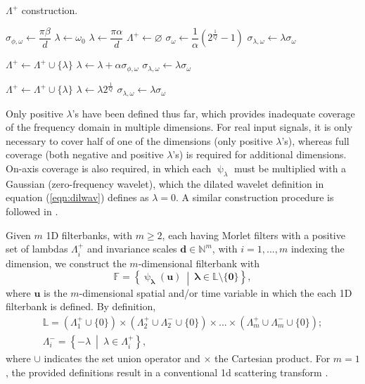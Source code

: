 \documentclass[journal]{IEEEtran}
\newcommand{\vect}[1]{\boldsymbol{\mathbf{#1}}}
\begin{document}
\begin{algorithm}    
\caption{$\Lambda^+$ construction.}\label{alg:fb}
\begin{algorithmic}
    \State $\sigma_{\phi, \omega} \gets \dfrac{\pi\beta}{d}$
        \State $\lambda \gets \omega_0$
    \Else{}
        \State $\lambda \gets \dfrac{\pi\alpha}{d}$
    \EndIf
    \State $\Lambda^+ \gets \varnothing$
    \State $\sigma_\omega \gets \dfrac{1}{\alpha}\left( 2^\frac{1}{Q} - 1 \right)$
    \State $\sigma_{\lambda, \omega} \gets \lambda\sigma_\omega$
    
        \State $\Lambda^+ \gets \Lambda^+ \cup \{\lambda\}$
        \State $\lambda \gets \lambda + \alpha \sigma_{\phi, \omega}$ 
        \State $\sigma_{\lambda, \omega} \gets \lambda\sigma_\omega$
    \EndWhile
    
    \While{$\lambda < \pi$}
        \State $\Lambda^+ \gets \Lambda^+ \cup \{\lambda\}$
        \State $\lambda \gets \lambda 2^{\frac{1}{Q}}$
        \State $\sigma_{\lambda, \omega} \gets \lambda\sigma_\omega$
    \EndWhile
\end{algorithmic}
\end{algorithm}

Only positive $\lambda$'s have been defined thus far, which provides inadequate coverage of the frequency domain in multiple dimensions. For real input signals, it is only necessary to cover half of one of the dimensions (only positive $\lambda$'s), whereas full coverage (both negative and positive $\lambda$'s) is required for additional dimensions. On-axis coverage is also required, in which each $\uppsi_\lambda$ must be multiplied with a Gaussian (zero-frequency wavelet), which the dilated wavelet definition in equation (\ref{eqn:dilwav}) defines as $\lambda=0$. A similar construction procedure is followed in \cite{jointtfscattering2}.

Given $m$ 1D filterbanks, with $m \ge 2$, each having Morlet filters with a positive set of lambdas $\Lambda_i^+$ and invariance scales $\vect{d} \in \mathbb{N}^m$, with $i = 1, ..., m$ indexing the dimension, we construct the $m$-dimensional filterbank with 
\begin{equation}
    \mathbb{F} = \left\{ \uppsi_{\vect{\lambda} }(\mathbf{u}) \ \middle| \ \vect{\lambda} \in \mathbb{L} \setminus \{\vect{0}\} \right\},
\end{equation}
where $\vect{u}$ is the $m$-dimensional spatial and/or time variable in which the each 1D filterbank is defined.  By definition, 
\begin{gather}
    \mathbb{L} = (\Lambda_1^+ \!\cup\! \{0\})\!\times\! (\Lambda_2^+ \!\cup\! \Lambda_2^- \!\cup \!\{0\}) \!\times\! ... \!\times\! (\Lambda_m^+ \!\cup\! \Lambda_m^- \!\cup\! \{0\}); \\
    \Lambda_i^- = \left\{-\lambda \ \middle| \ \lambda \in \Lambda_i^+\right\},
\end{gather}
where $\cup$ indicates the set union operator and $\times$ the Cartesian product. For $m=1$, the provided definitions result in a conventional \ac{1d} scattering transform \cite{1dscattering1}.
\end{document}
